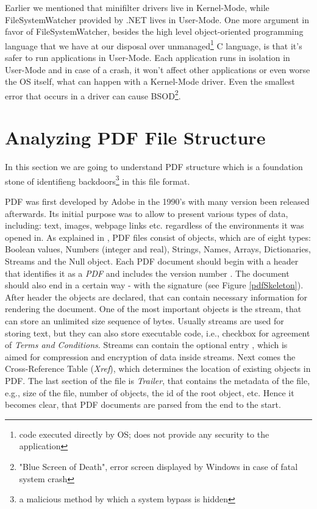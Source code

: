 Earlier we mentioned that minifilter drivers live in Kernel-Mode, while FileSystemWatcher provided by .NET lives in User-Mode. One more argument in favor of FileSystemWatcher, besides the high level object-oriented programming language \CSharp that we have at our disposal over unmanaged\footnote{code executed directly by OS; does not provide any security to the application} C language, is that it's safer to run applications in User-Mode. Each application runs in isolation in User-Mode and in case of a crash, it won't affect other applications or even worse the OS itself, what can happen with a Kernel-Mode driver. Even the smallest error that occurs in a driver can cause BSOD\footnote{"Blue Screen of Death", error screen displayed by Windows in case of fatal system crash}. 

\newpage
\section{Analyzing PDF File Structure}
\label{section:pdfStructure}
In this section we are going to understand PDF structure which is a foundation stone of identifieng backdoors\footnote{a malicious method by which a system bypass is hidden} in this file format. \par
PDF was first developed by Adobe in the 1990's with many version been released afterwards. Its initial purpose was to allow to present various types of data, including: text, images, webpage links etc. regardless of the environments it was opened in. As explained in \cite{pdfReference}, PDF files consist of objects, which are of eight types: Boolean values, Numbers (integer and real), Strings, Names, Arrays, Dictionaries, Streams and the Null object. Each PDF document should begin with a header that identifies it as a \textit{PDF} and includes the version number . The document should also end in a certain way - with the signature  (see Figure \ref{pdfSkeleton}). After header the objects are declared, that can contain necessary information for rendering the document. One of the most important objects is the stream, that can store an unlimited size sequence of bytes. Usually streams are used for storing text, but they can also store executable code, i.e., checkbox for agreement of \textit{Terms and Conditions}. Streams can contain the optional entry , which is aimed for compression and encryption of data inside streams. Next comes the Cross-Reference Table (\textit{Xref}), which 
determines the location of existing objects in PDF. The last section of the file is \textit{Trailer}, that contains the metadata of the file, e.g., size of the file, number of objects, the id of the root object, etc. Hence it becomes clear, that PDF documents are parsed from the end to the start.



